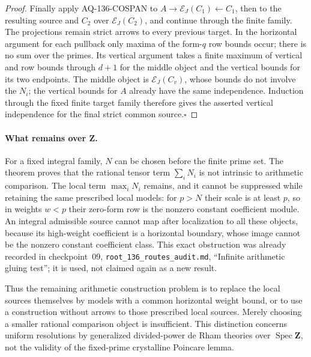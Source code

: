 \begin{proof}
Finally apply AQ-136-COSPAN to $A\to\mathcal E_J(C_1)\leftarrow C_1$,
then to the resulting source and $C_2$ over $\mathcal E_J(C_2)$,
and continue through the finite family.  The projections remain
strict arrows to every previous target.  In the horizontal argument
for each pullback only maxima of the form-$q$ row bounds occur;
there is no sum over the primes.  Its vertical argument takes a
finite maximum of vertical and row bounds through $d+1$ for the
middle object and the vertical bounds for its two endpoints.
The middle object is $\mathcal E_J(C_v)$, whose bounds do not
involve the $N_i$; the vertical bounds for $A$ already have the
same independence.  Induction through the fixed finite target
family therefore gives the asserted vertical independence for
the final strict common source.\hfill$\square$
\end{proof}

\paragraph{What remains over $\mathbf Z$.}
For a fixed integral family, $N$ can be chosen before the finite
prime set.  The theorem proves that the rational tensor term
$\sum_iN_i$ is not intrinsic to arithmetic comparison.  The local
term $\max_iN_i$ remains, and it cannot be suppressed while retaining
the same prescribed local models: for $p>N$ their scale is at least
$p$, so in weights $w<p$ their zero-form row is the nonzero constant
coefficient module.  An integral admissible source cannot map
after localization to all these objects, because its high-weight
coefficient is a horizontal boundary, whose image cannot be the
nonzero constant coefficient class.  This exact obstruction was
already recorded in checkpoint~09, \texttt{root\_136\_routes\_audit.md},
``Infinite arithmetic gluing test''; it is used, not claimed again
as a new result.

Thus the remaining arithmetic construction problem is to replace
the local sources themselves by models with a common horizontal
weight bound, or to use a construction without arrows to those
prescribed local sources.  Merely choosing a smaller rational
comparison object is insufficient.  This distinction concerns
uniform resolutions by generalized divided-power de Rham theories
over $\operatorname{Spec}\mathbf Z$, not the validity of the
fixed-prime crystalline Poincare lemma.
